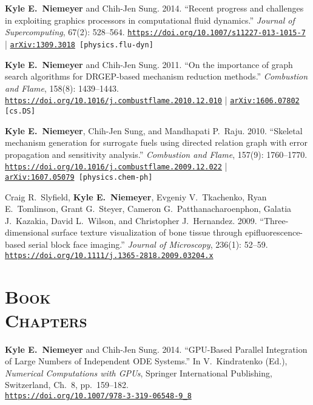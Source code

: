 \documentclass[margin,line,11pt]{res}
\makeatletter
\newlength{\bibhang}
\newlength{\bibsep}
 {\@listi \global\bibsep\itemsep \global\advance\bibsep by\parsep}
\newenvironment{bibenum*}
  {\renewcommand\labelenumi{\theenumi.}%
   \etaremune[
     topsep=0pt,
     itemsep=\bibsep,
     parsep=0pt,partopsep=0pt,
     itemindent=-\bibhang,
     leftmargin={\bibhang+\widthof{[999]}}]}
  {\endetaremune}
\newcommand*{\doi}[1]{\href{https://doi.org/#1}{\nolinkurl{https://doi.org/#1}}}
\makeatother
\begin{document}
\begin{resume}
\begin{bibenum*}
\item \textbf{Kyle E.~Niemeyer} and Chih-Jen Sung.
2014.
``Recent progress and challenges in exploiting graphics processors in computational fluid dynamics.''
\emph{Journal of Supercomputing}, 67(2): 528--564.
\doi{10.1007/s11227-013-1015-7} |
{\tt \href{http://arxiv.org/abs/1309.3018}{arXiv:1309.3018} [physics.flu-dyn]}

\item \textbf{Kyle E.~Niemeyer} and Chih-Jen Sung.
2011.
``On the importance of graph search algorithms for DRGEP-based mechanism reduction methods.''
\emph{Combustion and Flame}, 158(8): 1439--1443.
\doi{10.1016/j.combustflame.2010.12.010} |
{\tt \href{http://arxiv.org/abs/1606.07802}{arXiv:1606.07802} [cs.DS]}

\item \textbf{Kyle E.~Niemeyer}, Chih-Jen Sung, and Mandhapati P.\ Raju.
2010.
``Skeletal mechanism generation for surrogate fuels using directed relation graph with error propagation and sensitivity analysis.''
\emph{Combustion and Flame}, 157(9): 1760--1770. \\
\doi{10.1016/j.combustflame.2009.12.022} | \\
{\tt \href{http://arxiv.org/abs/1607.05079}{arXiv:1607.05079} [physics.chem-ph]}

\item Craig R.\ Slyfield, \textbf{Kyle E.~Niemeyer}, Evgeniy V.\ Tkachenko, Ryan E.\ Tomlinson, Grant G.\ Steyer, Cameron G.\ \mbox{Patthanacharoenphon}, Galatia J.\ Kazakia, David L.\ Wilson, and Christopher J.\ Hernandez.
2009.
``Three-dimensional surface texture visualization of bone tissue through epifluorescence-based serial block face imaging.''
\emph{Journal of Microscopy}, 236(1): 52--59.
\doi{10.1111/j.1365-2818.2009.03204.x}

\end{bibenum*}

\section{\textsc{Book\\Chapters}}

\begin{bibenum*}

\item \textbf{Kyle E.~Niemeyer} and Chih-Jen Sung.
2014.
``GPU-Based Parallel Integration of Large Numbers of Independent ODE Systems.''
In V.\ Kindratenko (Ed.), \emph{Numerical Computations with GPUs}, Springer International Publishing, Switzerland, Ch.\ 8, pp.\ 159--182. \\
\doi{10.1007/978-3-319-06548-9_8}


\end{bibenum*}
\end{resume}
\end{document}
